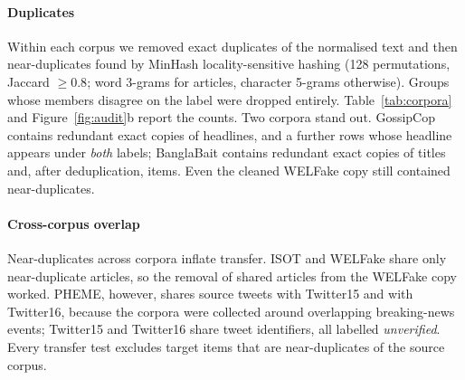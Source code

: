 \paragraph{Duplicates}
Within each corpus we removed exact duplicates of the normalised text and then near-duplicates found by MinHash locality-sensitive hashing \citep{broder1997minhash} (128 permutations, Jaccard $\geq0.8$; word 3-grams for articles, character 5-grams otherwise). Groups whose members disagree on the label were dropped entirely. Table~\ref{tab:corpora} and Figure~\ref{fig:audit}b report the counts. Two corpora stand out. GossipCop contains \GCexact{} redundant exact copies of headlines, and a further \GCconflict{} rows whose headline appears under \emph{both} labels; BanglaBait contains \BBexact{} redundant exact copies of titles and, after deduplication, \BBfinal{} items. Even the cleaned WELFake copy still contained \WELnear{} near-duplicates.

\paragraph{Cross-corpus overlap}
Near-duplicates across corpora inflate transfer. ISOT and WELFake share only \DupIW{} near-duplicate articles, so the removal of shared articles from the WELFake copy worked. PHEME, however, shares \DupPT{} source tweets with Twitter15 and \DupPTs{} with Twitter16, because the corpora were collected around overlapping breaking-news events; Twitter15 and Twitter16 share \TwShared{} tweet identifiers, all labelled \emph{unverified}. Every transfer test excludes target items that are near-duplicates of the source corpus.
